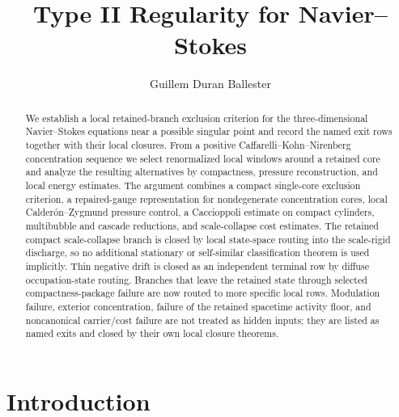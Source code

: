 \documentclass[11pt]{amsart}
\title[Type II Regularity]{Type II Regularity for Navier--Stokes}
\author{Guillem Duran Ballester}
\date{}
\theoremstyle{plain}
\theoremstyle{definition}
\theoremstyle{remark}
\begin{document}
\begin{abstract}
We establish a local retained-branch exclusion criterion for the
three-dimensional Navier--Stokes equations near a possible singular point and
record the named exit rows together with their local closures.  From a positive
Caffarelli--Kohn--Nirenberg concentration sequence we select renormalized local
windows around a retained core and analyze the resulting alternatives by
compactness, pressure reconstruction, and local energy estimates.  The argument
combines a compact single-core exclusion criterion, a repaired-gauge
representation for nondegenerate concentration cores, local Calder\'on--Zygmund
pressure control, a Caccioppoli estimate on compact cylinders, multibubble and
cascade reductions, and scale-collapse cost estimates.  The retained compact
scale-collapse branch is closed by local state-space routing into the
scale-rigid discharge, so no additional stationary or self-similar
classification theorem is used implicitly.  Thin negative drift is closed as an
independent terminal row by diffuse occupation-state routing.  Branches that
leave the retained state through selected compactness-package failure are now
routed to more specific local rows.  Modulation failure, exterior
concentration, failure of the retained spacetime activity floor, and
noncanonical carrier/cost failure
are not treated as hidden inputs; they are listed as named exits and closed
by their own local closure theorems.
\end{abstract}

\maketitle

\setcounter{tocdepth}{2}
\tableofcontents


\clearpage
\section{Introduction}
\end{document}
